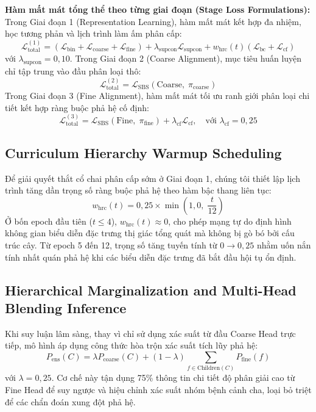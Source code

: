 \documentclass[runningheads]{llncs}
\begin{document}
\noindent \textbf{Hàm mất mát tổng thể theo từng giai đoạn (Stage Loss Formulations):} 
Trong Giai đoạn 1 (Representation Learning), hàm mất mát kết hợp đa nhiệm, học tương phản và lịch trình làm ấm phân cấp:
\begin{equation}
\mathcal{L}_{\text{total}}^{(1)} = \left(\mathcal{L}_{\text{bin}} + \mathcal{L}_{\text{coarse}} + \mathcal{L}_{\text{fine}}\right) + \lambda_{\text{supcon}} \mathcal{L}_{\text{supcon}} + w_{\text{hrc}}(t) \left(\mathcal{L}_{\text{bc}} + \mathcal{L}_{\text{cf}}\right)
\end{equation}
với $\lambda_{\text{supcon}} = 0{,}10$. Trong Giai đoạn 2 (Coarse Alignment), mục tiêu huấn luyện chỉ tập trung vào đầu phân loại thô:
\begin{equation}
\mathcal{L}_{\text{total}}^{(2)} = \mathcal{L}_{\text{SBS}}\left(\text{Coarse}, \; \pi_{\text{coarse}}\right)
\end{equation}
Trong Giai đoạn 3 (Fine Alignment), hàm mất mát tối ưu ranh giới phân loại chi tiết kết hợp ràng buộc phả hệ cố định:
\begin{equation}
\mathcal{L}_{\text{total}}^{(3)} = \mathcal{L}_{\text{SBS}}\left(\text{Fine}, \; \pi_{\text{fine}}\right) + \lambda_{\text{cf}} \mathcal{L}_{\text{cf}}, \quad \text{với } \lambda_{\text{cf}} = 0{,}25
\end{equation}

\subsection{Curriculum Hierarchy Warmup Scheduling}
Để giải quyết thắt cổ chai phân cấp sớm ở Giai đoạn 1, chúng tôi thiết lập lịch trình tăng dần trọng số ràng buộc phả hệ theo hàm bậc thang liên tục:
\begin{equation}
w_{\text{hrc}}(t) = 0{,}25 \times \min\left(1{,}0, \; \frac{t}{12}\right)
\end{equation}
Ở bốn epoch đầu tiên ($t \le 4$), $w_{\text{hrc}}(t) \approx 0$, cho phép mạng tự do định hình không gian biểu diễn đặc trưng thị giác tổng quát mà không bị gò bó bởi cấu trúc cây. Từ epoch 5 đến 12, trọng số tăng tuyến tính từ $0 \to 0{,}25$ nhằm uốn nắn tính nhất quán phả hệ khi các biểu diễn đặc trưng đã bắt đầu hội tụ ổn định.

\subsection{Hierarchical Marginalization and Multi-Head Blending Inference}
Khi suy luận lâm sàng, thay vì chỉ sử dụng xác suất từ đầu Coarse Head trực tiếp, mô hình áp dụng công thức hòa trộn xác suất tích lũy phả hệ:
\begin{equation}
P_{\text{ens}}(C) = \lambda P_{\text{coarse}}(C) + (1-\lambda) \sum_{f \in \text{Children}(C)} P_{\text{fine}}(f)
\end{equation}
với $\lambda = 0{,}25$. Cơ chế này tận dụng 75\% thông tin chi tiết độ phân giải cao từ Fine Head để suy ngược và hiệu chỉnh xác suất nhóm bệnh cảnh cha, loại bỏ triệt để các chẩn đoán xung đột phả hệ.
\end{document}
